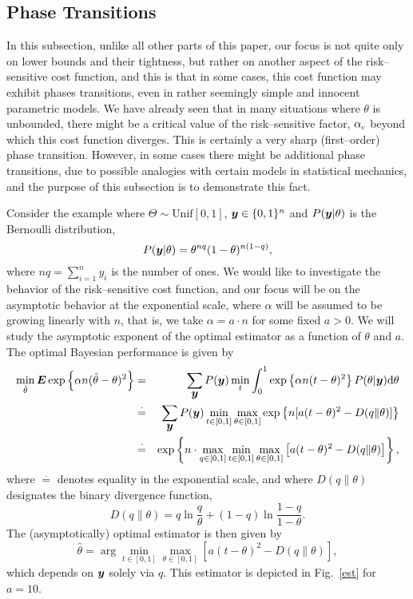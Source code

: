 \documentclass[11pt,epsf]{article}
\newcommand {\exe} {\stackrel{\cdot} {=}}
\newcommand{\ct}{\hat{\theta}}
\newcommand {\by} {\mbox{\boldmath $y$}}
\newcommand {\bE} {\mbox{\boldmath $E$}}
\begin{document}
\subsection{Phase Transitions}

In this subsection, unlike all other parts of this paper, our focus is not
quite only on lower bounds and their tightness, but rather on another aspect
of the risk--sensitive cost function, and this is that in some cases, this
cost function may exhibit phases transitions, even in rather seemingly simple
and innocent parametric models. We have already seen that in many situations
where $\theta$ is unbounded, there might be a critical value of the
risk--sensitive factor, $\alpha_{\mbox{\tiny c}}$ beyond which this cost
function diverges. This is certainly a very sharp (first--order) phase
transition. However, in some cases there might be additional phase
transitions, due to possible analogies with certain models in statistical
mechanics, and the purpose of this subsection is to demonstrate this fact.

Consider the example where $\Theta\sim\mbox{Unif}[0,1]$, $\by\in\{0,1\}^n$
and $P(\by|\theta)$ is the Bernoulli distribution,
\begin{equation}
P(\by|\theta)=\theta^{nq}(1-\theta)^{n(1-q)},
\end{equation}
where $nq=\sum_{i=1}^ny_i$ is the number of ones.
We would like to investigate the behavior of the risk--sensitive cost function,
and our focus will be on the
asymptotic behavior at the exponential scale, where $\alpha$ will be assumed
to be growing linearly with $n$, that is, we take $\alpha=a\cdot n$ for some
fixed $a > 0$.
We will study the asymptotic exponent of the optimal estimator as a function of $\theta$ and $a$.
The optimal Bayesian performance is given by 
\begin{eqnarray}
\min_{\ct}\bE\exp\left\{\alpha n(\ct-\theta)^2\right\}&=&
\sum_{\by}P(\by)\min_t\int_0^1 \exp\left\{\alpha
n(t-\theta)^2\right\}P(\theta|\by)\mbox{d}\theta\\
&\exe&\sum_{\by}P(\by)\min_{t\in[0,1]}\max_{\theta\in[0,1]} \exp\left\{n
[a (t-\theta)^2-D(q\|\theta)]\right\}\\
&\exe&\exp\left\{n\cdot\max_{q\in[0,1]}\min_{t\in[0,1]}\max_{\theta\in[0,1]}
\left[a (t-\theta)^2-D(q\|\theta)\right]\right\},
\end{eqnarray}
where $\exe$ denotes equality in the exponential scale, and
where $D(q\|\theta)$ designates the binary divergence function,
\begin{equation}
D(q\|\theta)=q\ln\frac{q}{\theta}+(1-q)\ln\frac{1-q}{1-\theta}.
\end{equation}
The (asymptotically) optimal estimator is then given by
\begin{equation}
\ct=\arg\min_{t\in[0,1]}\max_{\theta\in[0,1]}\left[a
(t-\theta)^2-D(q\|\theta)\right],
\end{equation}
which depends on $\by$ solely via $q$. This estimator is depicted in Fig.\
\ref{est} for
$a=10$.
\end{document}
